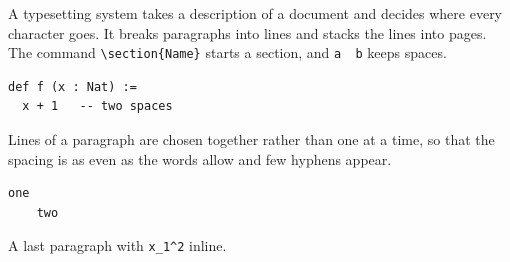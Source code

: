 \documentclass{article}
\begin{document}
A typesetting system takes a description of a document and decides where every character goes. It breaks paragraphs into lines and stacks the lines into pages. The command \verb|\section{Name}| starts a section, and \verb+a  b+ keeps spaces.

\begin{verbatim}
def f (x : Nat) :=
  x + 1   -- two spaces
\end{verbatim}

Lines of a paragraph are chosen together rather than one at a time, so that the spacing is as even as the words allow and few hyphens appear.

\begin{verbatim}
one
    two
\end{verbatim}
A last paragraph with \verb!x_1^2! inline.
\end{document}
